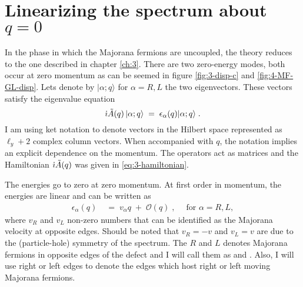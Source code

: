 \section[Linearizing the spectrum about zero momentum]{Linearizing the spectrum about $q  = 0$}

In the phase in which the Majorana fermions are uncoupled, the theory reduces to the one described in chapter \ref{ch:3}. There are two zero-energy modes, both occur at zero momentum as can be seemed in figure \ref{fig:3-disp-c} and \ref{fig:4-MF-GL-disp}. Lets denote by $\vert \alpha ; q \rangle$ for $\alpha = R , L$ the two eigenvectors. These vectors satisfy the eigenvalue equation
\begin{equation}
    \dot{\imath} \tilde{A}(q) \, \vert \alpha; q  \rangle \; = \; \epsilon_{\alpha}(q) \vert \alpha; q  \rangle \; . \label{eq:5-eva}
\end{equation}
I am using ket notation to denote vectors in the Hilbert space represented as $\ell_y+2$ complex column vectors. When accompanied with $q$, the notation implies an explicit dependence on the momentum. The operators act as matrices and the Hamiltonian $\dot{\imath} \tilde{A}(q)$ was given in \eqref{eq:3-hamiltonian}.

The energies go to zero at zero momentum. At first order in momentum, the energies are linear and can be written as 
\begin{align}
    \epsilon_{\alpha}(q) \;& = \; v_{\alpha} q \; + \; \mathcal{O}(q) \; , \quad  \; \text{for } \alpha = R , L,%
\end{align}
where $v_R$ and $v_L$  non-zero numbers that can be identified as the Majorana velocity at opposite edges. Should be noted that $v_{R} = -v$ and $v_{L}=v$ are  due to the (particle-hole) symmetry of the spectrum. %
The $R$ and $L$ denotes Majorana fermions in opposite edges of the defect and I will call them as   and . Also, I will use right or left edges to denote the edges which host right or left moving Majorana fermions.

